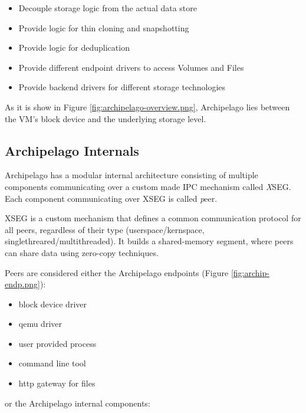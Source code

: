 \begin{itemize}        
\item Decouple storage logic from the actual data store 
\item Provide logic for thin cloning and snapshotting 
\item Provide logic for deduplication 
\item Provide different endpoint drivers to access Volumes and Files 
\item Provide backend drivers for different storage technologies
\end{itemize}

As it is show in Figure \ref{fig:archipelago-overview.png}, Archipelago lies
between the VM's block device and the underlying storage level.
  

\subsection{Archipelago Internals}

Archipelago has a modular internal architecture consisting of multiple
components communicating over a custom made IPC mechanism called \textit XSEG.
Each component communicating over XSEG is called \textit peer. 

XSEG is a custom mechanism that defines a common communication protocol for all
peers, regardless of their type (userspace/kernspace,
singlethreared/multithreaded). It builds a shared-memory segment, where peers
can share data using zero-copy techniques. 


Peers are considered either the Archipelago endpoints (Figure
\ref{fig:archip-endp.png}):
\begin{itemize}
\item block device driver
\item qemu driver
\item user provided process
\item command line tool
\item http gateway for files
\end{itemize}

or the Archipelago internal components:

